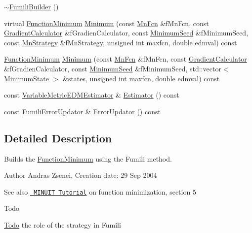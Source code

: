 \begin{DoxyCompactItemize}
\item 
\mbox{\hyperlink{classROOT_1_1Minuit2_1_1FumiliBuilder_a1de07586a1617732f49d59df92c44006}{$\sim$\+Fumili\+Builder}} ()
\item 
virtual \mbox{\hyperlink{classROOT_1_1Minuit2_1_1FunctionMinimum}{Function\+Minimum}} \mbox{\hyperlink{classROOT_1_1Minuit2_1_1FumiliBuilder_aa1889039835b4117cb2a9b7d49e4f6dd}{Minimum}} (const \mbox{\hyperlink{classROOT_1_1Minuit2_1_1MnFcn}{Mn\+Fcn}} \&f\+Mn\+Fcn, const \mbox{\hyperlink{classROOT_1_1Minuit2_1_1GradientCalculator}{Gradient\+Calculator}} \&f\+Gradien\+Calculator, const \mbox{\hyperlink{classROOT_1_1Minuit2_1_1MinimumSeed}{Minimum\+Seed}} \&f\+Minimum\+Seed, const \mbox{\hyperlink{classROOT_1_1Minuit2_1_1MnStrategy}{Mn\+Strategy}} \&f\+Mn\+Strategy, unsigned int maxfcn, double edmval) const
\item 
\mbox{\hyperlink{classROOT_1_1Minuit2_1_1FunctionMinimum}{Function\+Minimum}} \mbox{\hyperlink{classROOT_1_1Minuit2_1_1FumiliBuilder_ac0df0ebc275b75e6a6831f102f1753d2}{Minimum}} (const \mbox{\hyperlink{classROOT_1_1Minuit2_1_1MnFcn}{Mn\+Fcn}} \&f\+Mn\+Fcn, const \mbox{\hyperlink{classROOT_1_1Minuit2_1_1GradientCalculator}{Gradient\+Calculator}} \&f\+Gradien\+Calculator, const \mbox{\hyperlink{classROOT_1_1Minuit2_1_1MinimumSeed}{Minimum\+Seed}} \&f\+Minimum\+Seed, std\+::vector$<$ \mbox{\hyperlink{classROOT_1_1Minuit2_1_1MinimumState}{Minimum\+State}} $>$ \&states, unsigned int maxfcn, double edmval) const
\item 
const \mbox{\hyperlink{classROOT_1_1Minuit2_1_1VariableMetricEDMEstimator}{Variable\+Metric\+E\+D\+M\+Estimator}} \& \mbox{\hyperlink{classROOT_1_1Minuit2_1_1FumiliBuilder_a1e7bd763cd6677dd08d528079143d7b2}{Estimator}} () const
\item 
const \mbox{\hyperlink{classROOT_1_1Minuit2_1_1FumiliErrorUpdator}{Fumili\+Error\+Updator}} \& \mbox{\hyperlink{classROOT_1_1Minuit2_1_1FumiliBuilder_a03face0b120b333aea0b49d5531518ef}{Error\+Updator}} () const
\end{DoxyCompactItemize}


\subsection{Detailed Description}
Builds the \mbox{\hyperlink{classROOT_1_1Minuit2_1_1FunctionMinimum}{Function\+Minimum}} using the Fumili method.

\begin{DoxyAuthor}{Author}
Andras Zsenei, Creation date\+: 29 Sep 2004
\end{DoxyAuthor}
\begin{DoxySeeAlso}{See also}
\href{http://www.cern.ch/winkler/minuit/tutorial/mntutorial.pdf}{\texttt{ M\+I\+N\+U\+IT Tutorial}} on function minimization, section 5
\end{DoxySeeAlso}
\begin{DoxyRefDesc}{Todo}
\item[\mbox{\hyperlink{todo__todo000002}{Todo}}]the role of the strategy in Fumili\end{DoxyRefDesc}


